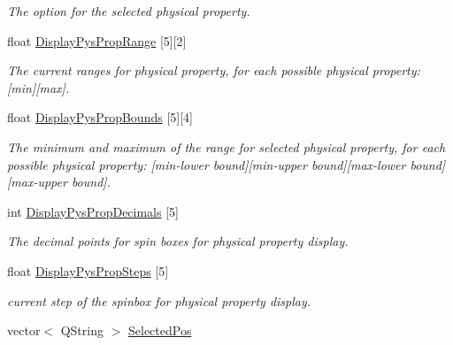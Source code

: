\begin{DoxyCompactItemize}
\begin{DoxyCompactList}\small\item\em The option for the selected physical property. \end{DoxyCompactList}\item 
\hypertarget{classGLWidget_a1748fb50c9552ff8bfc37674e094db3a}{}float \hyperlink{classGLWidget_a1748fb50c9552ff8bfc37674e094db3a}{Display\+Pys\+Prop\+Range} \mbox{[}5\mbox{]}\mbox{[}2\mbox{]}\label{classGLWidget_a1748fb50c9552ff8bfc37674e094db3a}

\begin{DoxyCompactList}\small\item\em The current ranges for physical property, for each possible physical property\+: \mbox{[}min\mbox{]}\mbox{[}max\mbox{]}. \end{DoxyCompactList}\item 
\hypertarget{classGLWidget_ac0ba05c87161b879805d40d899a9aefa}{}float \hyperlink{classGLWidget_ac0ba05c87161b879805d40d899a9aefa}{Display\+Pys\+Prop\+Bounds} \mbox{[}5\mbox{]}\mbox{[}4\mbox{]}\label{classGLWidget_ac0ba05c87161b879805d40d899a9aefa}

\begin{DoxyCompactList}\small\item\em The minimum and maximum of the range for selected physical property, for each possible physical property\+: \mbox{[}min-\/lower bound\mbox{]}\mbox{[}min-\/upper bound\mbox{]}\mbox{[}max-\/lower bound\mbox{]}\mbox{[}max-\/upper bound\mbox{]}. \end{DoxyCompactList}\item 
\hypertarget{classGLWidget_a09145c9029860cc666005168a7db52b4}{}int \hyperlink{classGLWidget_a09145c9029860cc666005168a7db52b4}{Display\+Pys\+Prop\+Decimals} \mbox{[}5\mbox{]}\label{classGLWidget_a09145c9029860cc666005168a7db52b4}

\begin{DoxyCompactList}\small\item\em The decimal points for spin boxes for physical property display. \end{DoxyCompactList}\item 
\hypertarget{classGLWidget_a22184489528112f605a96bea8ab0409e}{}float \hyperlink{classGLWidget_a22184489528112f605a96bea8ab0409e}{Display\+Pys\+Prop\+Steps} \mbox{[}5\mbox{]}\label{classGLWidget_a22184489528112f605a96bea8ab0409e}

\begin{DoxyCompactList}\small\item\em current step of the spinbox for physical property display. \end{DoxyCompactList}\item 
\hypertarget{classGLWidget_ac238abe591ebaf2aa26a65378a65ce0f}{}vector$<$ Q\+String $>$ \hyperlink{classGLWidget_ac238abe591ebaf2aa26a65378a65ce0f}{Selected\+Pos}\label{classGLWidget_ac238abe591ebaf2aa26a65378a65ce0f}


\end{DoxyCompactItemize}
